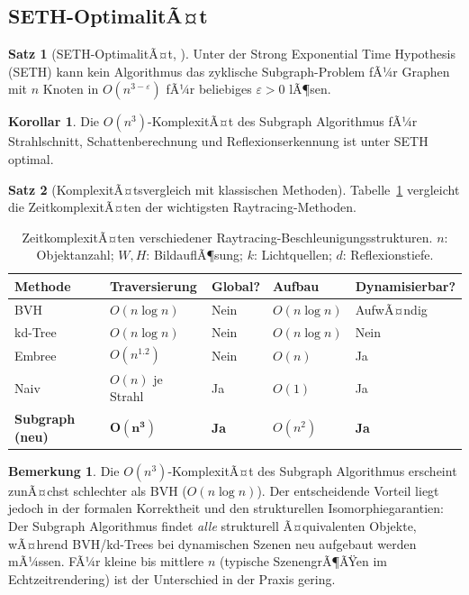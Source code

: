 ﻿\documentclass[a4paper,12pt]{article}
\theoremstyle{definition}
\newtheorem{satz}{Satz}[section]
\newtheorem{korollar}{Korollar}[section]
\newtheorem{bemerkung}{Bemerkung}[section]
\begin{document}
\subsection{SETH-OptimalitÃ¤t}

\begin{satz}[SETH-OptimalitÃ¤t, \citealt{Epp2026}]
  \label{satz:seth}
  Unter der Strong Exponential Time Hypothesis (SETH) kann kein
  Algorithmus das zyklische Subgraph-Problem fÃ¼r Graphen mit $n$
  Knoten in $O(n^{3-\varepsilon})$ fÃ¼r beliebiges $\varepsilon > 0$
  lÃ¶sen.
\end{satz}

\begin{korollar}
  Die $O(n^3)$-KomplexitÃ¤t des Subgraph Algorithmus fÃ¼r
  Strahlschnitt, Schattenberechnung und Reflexionserkennung ist
  unter SETH optimal.
\end{korollar}

\begin{satz}[KomplexitÃ¤tsvergleich mit klassischen Methoden]
  \label{satz:komplexitaet_vergleich}
  Tabelle~\ref{tab:komplexitaet} vergleicht die
  ZeitkomplexitÃ¤ten der wichtigsten Raytracing-Methoden.
\end{satz}

\begin{table}[htbp]
  \centering
  \caption{ZeitkomplexitÃ¤ten verschiedener Raytracing-Beschleunigungsstrukturen.
           $n$: Objektanzahl; $W, H$: BildauflÃ¶sung;
           $k$: Lichtquellen; $d$: Reflexionstiefe.}
  \label{tab:komplexitaet}
  \begin{tabular}{@{}lllll@{}}
    \toprule
    Methode & Traversierung & Global? & Aufbau & Dynamisierbar? \\
    \midrule
    BVH \citep{Rubin1980}    & $O(n \log n)$ & Nein & $O(n \log n)$ & AufwÃ¤ndig \\
    kd-Tree \citep{Bentley1975} & $O(n \log n)$ & Nein & $O(n \log n)$ & Nein \\
    Embree \citep{Wald2014}  & $O(n^{1.2})$ & Nein & $O(n)$        & Ja \\
    Naiv                     & $O(n)$ je Strahl & Ja & $O(1)$ & Ja \\
    \textbf{Subgraph (neu)}  & $\mathbf{O(n^3)}$ & \textbf{Ja} & $O(n^2)$ & \textbf{Ja} \\
    \bottomrule
  \end{tabular}
\end{table}

\begin{bemerkung}
  Die $O(n^3)$-KomplexitÃ¤t des Subgraph Algorithmus erscheint
  zunÃ¤chst schlechter als BVH ($O(n \log n)$). Der entscheidende
  Vorteil liegt jedoch in der formalen Korrektheit und den
  strukturellen Isomorphiegarantien: Der Subgraph Algorithmus
  findet \emph{alle} strukturell Ã¤quivalenten Objekte, wÃ¤hrend
  BVH/kd-Trees bei dynamischen Szenen neu aufgebaut werden mÃ¼ssen.
  FÃ¼r kleine bis mittlere $n$ (typische SzenengrÃ¶ÃŸen im
  Echtzeitrendering) ist der Unterschied in der Praxis gering.
\end{bemerkung}
\end{document}
